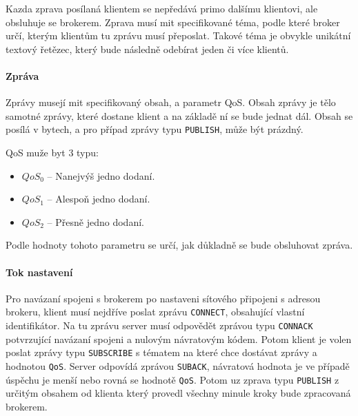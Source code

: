 Kazda zprava posílaná klientem se nepředává primo dalšímu klientovi, ale obsluhuje se brokerem. Zprava musí mit specifikované téma, podle které broker určí, kterým klientům tu zprávu musí přeposlat. Takové téma je obvykle unikátní textový řetězec, který bude následně odebírat jeden či více klientů.

\paragraph{Zpráva}
\label{par:message}

Zprávy musejí mit specifikovaný obsah, a parametr QoS. Obsah zprávy je tělo samotné zprávy, které dostane klient a na základě ní se bude jednat dál. Obsah se posílá v bytech, a pro případ zprávy typu \texttt{PUBLISH}, může být prázdný.

QoS muže byt 3 typu:
\begin{itemize}
  \item $QoS_0$ -- Nanejvýš jedno dodaní.
  \item $QoS_1$ -- Alespoň jedno dodaní.
  \item $QoS_2$ -- Přesně jedno dodaní.
\end{itemize}

Podle hodnoty tohoto parametru se určí, jak důkladně se bude obsluhovat zpráva.

\paragraph{Tok nastavení}

Pro navázaní spojeni s brokerem po nastaveni sítového připojeni s adresou brokeru, klient musí nejdříve poslat zprávu \texttt{CONNECT}, obsahující vlastní identifikátor. Na tu zprávu server musí odpovědět zprávou typu \texttt{CONNACK} potvrzující navázaní spojeni a nulovým návratovým kódem. Potom klient je volen poslat zprávy typu \texttt{SUBSCRIBE} s tématem na které chce dostávat zprávy a hodnotou \texttt{QoS}. Server odpovídá zprávou \texttt{SUBACK}, návratová hodnota je ve případě úspěchu je menší nebo rovná se hodnotě \texttt{QoS}. Potom uz zprava typu \texttt{PUBLISH} z určitým obsahem od klienta který provedl všechny minule kroky bude zpracovaná brokerem.

